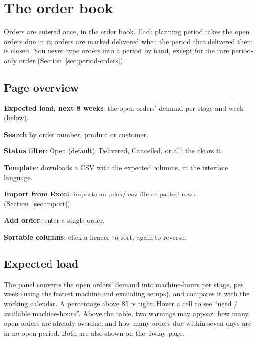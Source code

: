\chapter{The order book}\label{ch:orders}

Orders are entered once, in the order book. Each planning period takes the open orders due in it; orders are
marked delivered when the period that delivered them is closed. You never type orders into a period by hand,
except for the rare period-only order (Section~\ref{sec:period-orders}).

\section{Page overview}


\begin{callouts}
  \item[1] \textbf{Expected load, next 8 weeks}: the open orders' demand per stage and week (below).
  \item[2] \textbf{Search} by order number, product or customer.
  \item[3] \textbf{Status filter}: Open (default), Delivered, Cancelled, or all; the \ui{\texttimes} clears it.
  \item[4] \textbf{Template}: downloads a CSV with the expected columns, in the interface language.
  \item[5] \textbf{Import from Excel}: imports an .xlsx/.csv file or pasted rows (Section~\ref{sec:import}).
  \item[6] \textbf{Add order}: enter a single order.
  \item[7] \textbf{Sortable columns}: click a header to sort, again to reverse.
\end{callouts}

\section{Expected load}

The panel converts the open orders' demand into machine-hours per stage, per week (using the fastest machine
and excluding setups), and compares it with the working calendar. A percentage above 85 is tight. Hover a
cell to see ``need / available machine-hours''. Above the table, two warnings may appear: how many open orders
are already overdue, and how many orders due within seven days are in no open period. Both are also shown
on the Today page.

